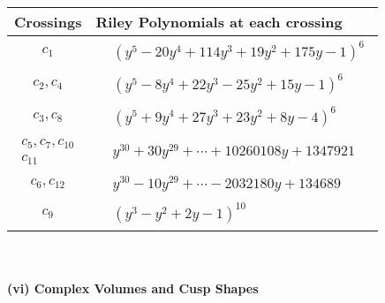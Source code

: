 \documentclass[1p]{elsarticle_modified}
\theoremstyle{definition}
\begin{document}
\begin{tabular}{m{50pt}|m{274pt}}
Crossings & \hspace{64pt}Riley Polynomials at each crossing \\
\hline $$\begin{aligned}c_{1}\end{aligned}$$&$\begin{aligned}
&(y^5-20 y^4+114 y^3+19 y^2+175 y-1)^6
\end{aligned}$\\
\hline $$\begin{aligned}c_{2},c_{4}\end{aligned}$$&$\begin{aligned}
&(y^5-8 y^4+22 y^3-25 y^2+15 y-1)^6
\end{aligned}$\\
\hline $$\begin{aligned}c_{3},c_{8}\end{aligned}$$&$\begin{aligned}
&(y^5+9 y^4+27 y^3+23 y^2+8 y-4)^6
\end{aligned}$\\
\hline $$\begin{aligned}c_{5},c_{7},c_{10}\\c_{11}\end{aligned}$$&$\begin{aligned}
&y^{30}+30 y^{29}+\cdots+10260108 y+1347921
\end{aligned}$\\
\hline $$\begin{aligned}c_{6},c_{12}\end{aligned}$$&$\begin{aligned}
&y^{30}-10 y^{29}+\cdots-2032180 y+134689
\end{aligned}$\\
\hline $$\begin{aligned}c_{9}\end{aligned}$$&$\begin{aligned}
&(y^3- y^2+2 y-1)^{10}
\end{aligned}$\\
\hline
\end{tabular}\\~\\
\newpage\flushleft \textbf{(vi) Complex Volumes and Cusp Shapes}
\end{document}
